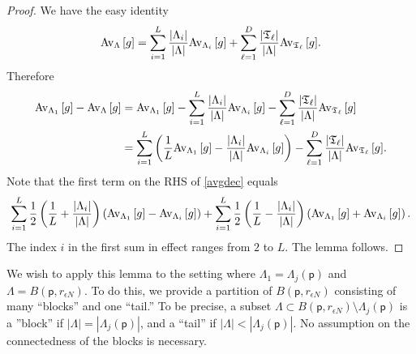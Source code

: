 \documentclass[11pt]{amsart}
\theoremstyle{plain}
\theoremstyle{definition}
\theoremstyle{remark}
\begin{document}
\begin{proof}
We have the easy identity
\begin{align*}
{{\rm Av}_{{\Lambda}}\left[{{g}}\right]} = \sum_{i=1}^L \frac{|\Lambda_i|}{|\Lambda|} {{\rm Av}_{{\Lambda_i}}\left[{{g}}\right]} + \sum_{\ell=1}^D \frac{|\mathfrak{T}_\ell|}{|\Lambda|} {{\rm Av}_{{\mathfrak{T}_\ell}}\left[{{g}}\right]}.
\end{align*}
Therefore
\begin{align}
\nonumber {{\rm Av}_{{\Lambda_1}}\left[{{g}}\right]} - {{\rm Av}_{{\Lambda}}\left[{{g}}\right]} &= {{\rm Av}_{{\Lambda_1}}\left[{{g}}\right]} - \sum_{i=1}^L \frac{|\Lambda_i|}{|\Lambda|} {{\rm Av}_{{\Lambda_i}}\left[{{g}}\right]}- \sum_{\ell=1}^D \frac{|\mathfrak{T}_\ell|}{|\Lambda|} {{\rm Av}_{{\mathfrak{T}_\ell}}\left[{{g}}\right]} \\
\label{avgdec} &= \sum_{i=1}^L \left(\frac{1}{L} {{\rm Av}_{{\Lambda_1}}\left[{{g}}\right]} - \frac{|\Lambda_i|}{|\Lambda|} {{\rm Av}_{{\Lambda_i}}\left[{{g}}\right]}\right) - \sum_{\ell=1}^D \frac{|\mathfrak{T}_\ell|}{|\Lambda|} {{\rm Av}_{{\mathfrak{T}_\ell}}\left[{{g}}\right]}.
\end{align}
Note that the first term on the RHS of \eqref{avgdec} equals
\begin{align*}
\sum_{i=1}^L \frac{1}{2}\left(\frac{1}{L} + \frac{|\Lambda_i|}{|\Lambda|}\right) \left( {{\rm Av}_{{\Lambda_1}}\left[{{g}}\right]} - {{\rm Av}_{{\Lambda_i}}\left[{{g}}\right]} \right) + \sum_{i=1}^L \frac{1}{2}\left(\frac{1}{L} - \frac{|\Lambda_i|}{|\Lambda|}\right) \left( {{\rm Av}_{{\Lambda_1}}\left[{{g}}\right]} + {{\rm Av}_{{\Lambda_i}}\left[{{g}}\right]} \right).
\end{align*}
The index $i$ in the first sum in effect ranges from $2$ to $L$. The lemma follows.
\end{proof}

We wish to apply this lemma to the setting where $\Lambda_1 = \Lambda_j({\mathsf{p}})$ and $\Lambda = B({\mathsf{p}}, r_{\epsilon N})$. To do this, we provide a partition of $B({\mathsf{p}},r_{\epsilon N})$ consisting of many ``blocks'' and one ``tail.'' To be precise, a subset $\Lambda \subset B({\mathsf{p}},r_{\epsilon N}) \setminus \Lambda_j({\mathsf{p}})$ is a ''block'' if $|\Lambda| = |\Lambda_j({\mathsf{p}})|$, and a ``tail'' if $|\Lambda|<|\Lambda_j({\mathsf{p}})|$. No assumption on the connectedness of the blocks is necessary.
\end{document}
